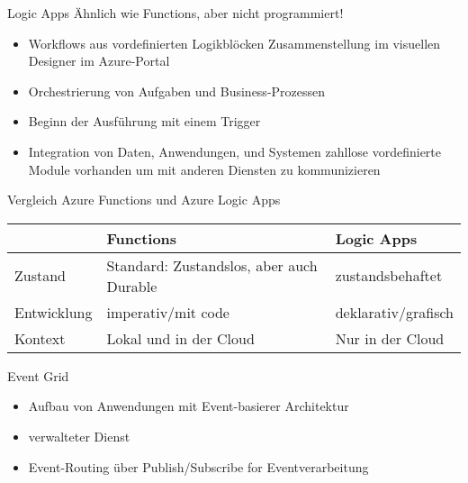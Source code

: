 \begin{flashcard}[Definition]{Logic Apps}
    Ähnlich wie Functions, aber nicht programmiert!
    \begin{itemize}
        \item Workflows aus vordefinierten Logikblöcken\newline
        Zusammenstellung im visuellen Designer im Azure-Portal
        \item Orchestrierung von Aufgaben und Business-Prozessen
        \item Beginn der Ausführung mit einem Trigger
        \item Integration von Daten, Anwendungen, und Systemen\newline
        zahllose vordefinierte Module vorhanden um mit anderen Diensten zu kommunizieren
    \end{itemize}

\end{flashcard}

\begin{flashcard}[\ ]{Vergleich Azure Functions und Azure Logic Apps}
    \begin{tabular}{l|p{34mm}p{34mm}}
                & \textbf{Functions}                                             & \textbf{Logic Apps} \\
        \hline
        Zustand & Standard: Zustandslos, aber auch Durable                  & zustandsbehaftet                                                                         \\
        Entwicklung & imperativ/mit code                                        & deklarativ/grafisch                                                               \\
        Kontext  & Lokal und in der Cloud                                    & Nur in der Cloud                                                                  \\
    \end{tabular}
\end{flashcard}

\begin{flashcard}[Describe]{Event Grid}
    \begin{itemize}
        \item Aufbau von Anwendungen mit Event-basierer Architektur
        \item verwalteter Dienst
        \item Event-Routing über Publish/Subscribe for Eventverarbeitung
    \end{itemize}

\end{flashcard}

